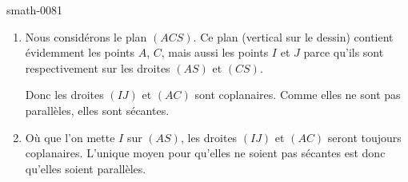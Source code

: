 
\begin{corrige}{smath-0081}

    \begin{enumerate}
        \item
            Nous considérons le plan \( (ACS)\). Ce plan (vertical sur le dessin) contient évidemment les points \( A\), \( C\), mais aussi les points \( I\) et \( J\) parce qu'ils sont respectivement sur les droites \( (AS)\) et \( (CS)\).

            Donc les droites \( (IJ)\) et \( (AC)\) sont coplanaires. Comme elles ne sont pas parallèles, elles sont sécantes.
        \item
            Où que l'on mette \( I\) sur \( (AS)\), les droites \( (IJ)\) et \( (AC)\) seront toujours coplanaires. L'unique moyen pour qu'elles ne soient pas sécantes est donc qu'elles soient parallèles.       
    \end{enumerate}

\end{corrige}
